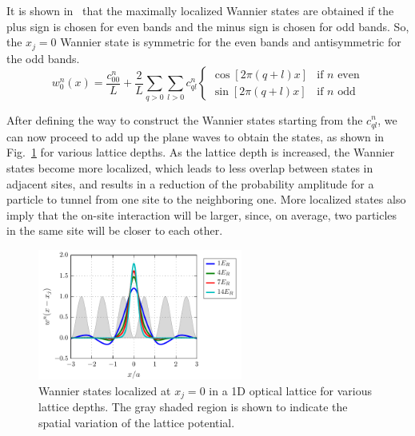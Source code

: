 It is shown in~\cite{Kohn1959} that the maximally localized Wannier states are
obtained if the plus sign is chosen for even bands and the minus sign is chosen
for odd bands.  So, the $x_{j}=0$ Wannier state is symmetric for the even bands
and antisymmetric for the odd bands.  
\begin{equation}
  w_{0}^{n}(x)= 
    \frac{c_{00}^{n}}{L}
   + 
    \frac{2}{L}
    \sum_{q>0} 
   \sum_{l > 0 } 
   c_{ql}^{n} 
\begin{cases}
\cos[ 2\pi(q+l)x ] & \text{if $n$ even} \\
\sin[ 2\pi(q+l)x ] & \text{if $n$ odd }
\end{cases}
\end{equation}

After defining the way to construct the Wannier states starting from the
$c_{ql}^{n}$, we can now proceed to add up the plane waves to  obtain the
states, as shown in Fig.~\ref{fig:wannier1d_V0} for various lattice depths.  As
the lattice depth is increased, the Wannier states become more localized, which
leads to less overlap between states in adjacent sites, and results in a
reduction of the probability amplitude for a particle to tunnel from one site
to the neighboring one.   More localized states also imply that the on-site
interaction will be larger, since, on average, two particles in the same site
will be closer to each other.  
\begin{figure}
\centering
\includegraphics[width=0.6\textwidth]{../figures/BandStructure_figures/wannier1d_V0.pdf}
\caption[Wannier states in 1D lattice for various lattice depths.]{\small
Wannier states localized at $x_{j}=0$ in a 1D optical lattice for various
lattice depths.  The gray shaded region is shown to  indicate the spatial
variation of the lattice potential.  } \label{fig:wannier1d_V0}
\end{figure}


